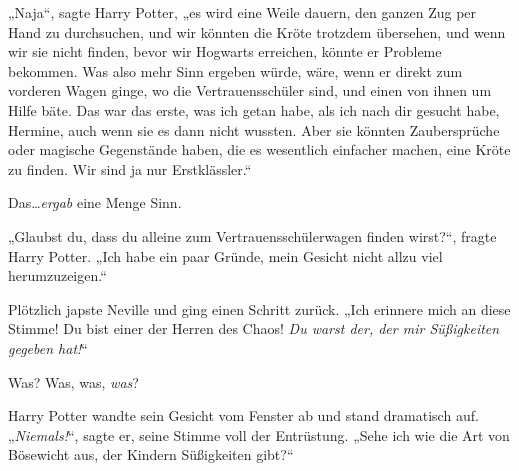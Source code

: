 „Naja“, sagte Harry Potter, „es wird eine Weile dauern, den ganzen Zug per Hand zu durchsuchen, und wir könnten die Kröte trotzdem übersehen, und wenn wir sie nicht finden, bevor wir Hogwarts erreichen, könnte er Probleme bekommen. Was also mehr Sinn ergeben würde, wäre, wenn er direkt zum vorderen Wagen ginge, wo die Vertrauensschüler sind, und einen von ihnen um Hilfe bäte. Das war das erste, was ich getan habe, als ich nach dir gesucht habe, Hermine, auch wenn sie es dann nicht wussten. Aber sie könnten Zaubersprüche oder magische Gegenstände haben, die es wesentlich einfacher machen, eine Kröte zu finden. Wir sind ja nur Erstklässler.“

Das…\emph{ergab} eine Menge Sinn.

„Glaubst du, dass du alleine zum Vertrauensschülerwagen finden wirst?“, fragte Harry Potter. „Ich habe ein paar Gründe, mein Gesicht nicht allzu viel herumzuzeigen.“

Plötzlich japste Neville und ging einen Schritt zurück. „Ich erinnere mich an diese Stimme! Du bist einer der Herren des Chaos! \emph{Du warst der, der mir Süßigkeiten gegeben hat!}“

Was? Was, was, \emph{was}?

Harry Potter wandte sein Gesicht vom Fenster ab und stand dramatisch auf. „\emph{Niemals!}“, sagte er, seine Stimme voll der Entrüstung. „Sehe ich wie die Art von Bösewicht aus, der Kindern Süßigkeiten gibt?“


